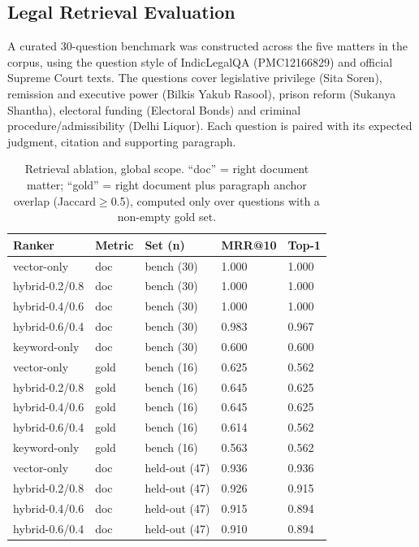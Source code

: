 \documentclass[12pt]{article}
\newcounter{procedure}
\begin{document}
\subsection{Legal Retrieval Evaluation}
A curated 30-question benchmark was constructed across the five matters in the corpus, using the question style of IndicLegalQA (PMC12166829) and official Supreme Court texts. The questions cover legislative privilege (Sita Soren), remission and executive power (Bilkis Yakub Rasool), prison reform (Sukanya Shantha), electoral funding (Electoral Bonds) and criminal procedure/admissibility (Delhi Liquor). Each question is paired with its expected judgment, citation and supporting paragraph.

\begin{table}[!htbp]
\centering
\caption{Retrieval ablation, global scope. ``doc'' = right document matter; ``gold'' = right document plus paragraph anchor overlap (Jaccard$\ge$0.5), computed only over questions with a non-empty gold set.}
\label{tab:eval}
\begin{tabularx}{0.95\textwidth}{p{}p{}p{}p{}p{}}
\toprule
Ranker & Metric & Set (n) & MRR@10 & Top-1 \\
\midrule
vector-only     & doc  & bench (30)   & 1.000 & 1.000 \\
hybrid-0.2/0.8  & doc  & bench (30)   & 1.000 & 1.000 \\
hybrid-0.4/0.6 & doc  & bench (30)   & 1.000 & 1.000 \\
hybrid-0.6/0.4 & doc  & bench (30)   & 0.983 & 0.967 \\
keyword-only    & doc  & bench (30)   & 0.600 & 0.600 \\
\midrule
vector-only     & gold & bench (16)   & 0.625 & 0.562 \\
hybrid-0.2/0.8  & gold & bench (16)   & 0.645 & 0.625 \\
hybrid-0.4/0.6 & gold & bench (16)   & 0.645 & 0.625 \\
hybrid-0.6/0.4 & gold & bench (16)   & 0.614 & 0.562 \\
keyword-only    & gold & bench (16)   & 0.563 & 0.562 \\
\midrule
vector-only     & doc  & held-out (47) & 0.936 & 0.936 \\
hybrid-0.2/0.8  & doc  & held-out (47) & 0.926 & 0.915 \\
hybrid-0.4/0.6 & doc  & held-out (47) & 0.915 & 0.894 \\
hybrid-0.6/0.4 & doc  & held-out (47) & 0.910 & 0.894 \\

\end{tabularx}
\end{table}
\end{document}

